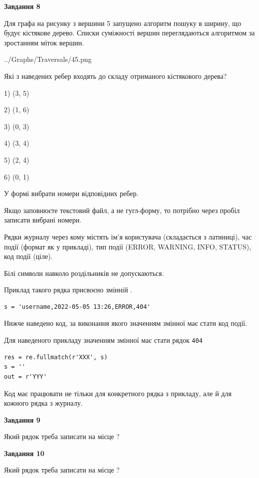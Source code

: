 \documentclass[12pt, ukrainian]{article}
\def\code#1{\Verb!#1!}
\begin{document}
{\begin {large}
{\begin {center}\textbf{Завдання 8}\end {center}}\par
Для графа на рисунку з вершини 5 запущено алгоритм пошуку в ширину, що будує кістякове дерево. Списки суміжності вершин переглядаються алгоритмом за зростанням міток вершин.\par
\begin{center}
	{../Graphs/Traversals/45.png}
\end{center}
\par Які з наведених ребер входять до складу отриманого кістякового дерева?\par
1) (3, 5)\par
2) (1, 6)\par
3) (0, 3)\par
4) (3, 4)\par
5) (2, 4)\par
6) (0, 1)\par
{\vskip 15pt} У формі вибрати номери відповідних ребер.


Якщо заповнюєте текстовий файл, а не гугл-форму, то потрібно через пробіл записа\-ти вибрані номери.\par
\newpage


Рядки журналу через кому містять ім'я користувача (складається з латиниці), час події (фор\-мат як у прикладі), тип події (ERROR, WARNING, INFO, STATUS), код події (ціле).

Білі символи навколо роздільників не допускаються.

Приклад такого рядка присвоєно змінній .



\begin{verbatim}
s = 'username,2022-05-05 13:26,ERROR,404'
\end{verbatim}


Нижче наведено код, за виконання якого значенням змінної  має стати код події.

Для наведеного прикладу значенням змінної  має стати рядок \code{404}



\begin{verbatim}
res = re.fullmatch(r'XXX', s)
s = ''
out = r'YYY'
\end{verbatim}


Код має працювати не тільки для конкретного рядка з прикладу, але й для кожного рядка з журналу.

{\begin {center}\textbf{Завдання 9}\end {center}}\par
Який рядок треба записати на місце  ?\par
\vspace{5mm}


{\begin {center}\textbf{Завдання 10}\end {center}}\par
Який рядок треба записати на місце  ?\par


\newpage


\end {large}}
\end{document}
